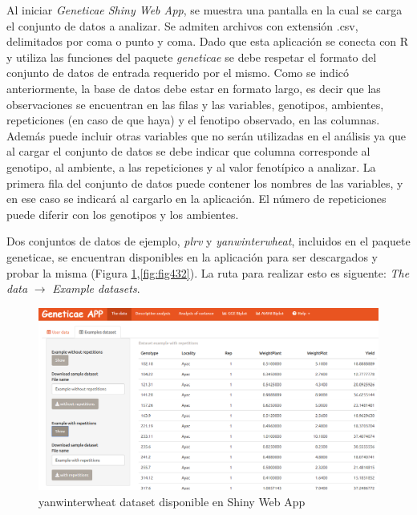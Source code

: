 Al iniciar \emph{Geneticae Shiny Web App}, se muestra una pantalla en la cual se carga el conjunto de datos a analizar. Se admiten archivos con extensión .csv, delimitados por coma o punto y coma.
Dado que esta aplicación se conecta con R y utiliza las funciones del paquete \emph{geneticae} se debe respetar el formato del conjunto de datos de entrada requerido por el mismo. Como se indicó anteriormente, la base de datos debe estar en formato largo, es decir que las observaciones se encuentran en las filas y las variables, genotipos, ambientes, repeticiones (en caso de que haya) y el fenotipo observado, en las columnas. Además puede incluir otras variables que no serán utilizadas en el análisis ya que al cargar el conjunto de datos se debe indicar que columna corresponde al genotipo, al ambiente, a las repeticiones y al valor fenotípico a analizar. La primera fila del conjunto de datos puede contener los nombres de las variables, y en ese caso se indicará al cargarlo en la aplicación. El número de repeticiones puede diferir con los genotipos y los ambientes.

Dos conjuntos de datos de ejemplo, \emph{plrv} y \emph{yanwinterwheat}, incluidos en el paquete geneticae, se encuentran disponibles en la aplicación para ser descargados y probar la misma (Figura \ref{fig:fig431},\ref{fig:fig432}). La ruta para realizar esto es siguente: \emph{The data} $\rightarrow$ \emph{Example datasets}.

 \begin{figure}[H]
	\begin{center}
		\includegraphics[width=16cm]{./Graficos/Exampledatasets_withoutrep.png}
	\end{center}
	\caption{yanwinterwheat dataset disponible en Shiny Web App}
	\label{fig:fig431}
\end{figure}

